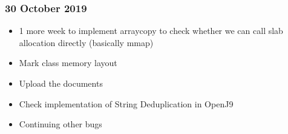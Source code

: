 \subsubsection{30 October 2019}

\begin{itemize}
\item 1 more week to implement arraycopy to check whether we can call slab allocation directly (basically mmap)
\item Mark class memory layout
\item Upload the documents
\item Check implementation of String Deduplication in OpenJ9
\item Continuing other bugs
\end{itemize}
